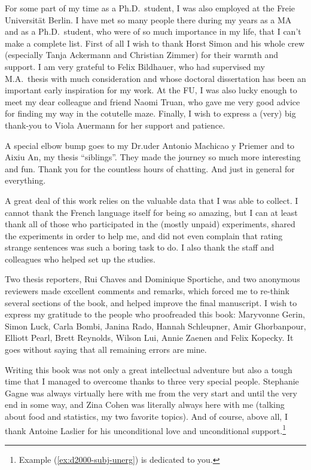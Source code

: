 For some part of my time as a Ph.D.\ student, I was also employed at the Freie Universität Berlin. I have met so many people there during my years as a MA and as a Ph.D.\ student, who were of so much importance in my life, that I can't make a complete list. First of all I wish to thank Horst Simon and his whole crew (especially Tanja Ackermann and Christian Zimmer) for their warmth and support. I am very grateful to Felix Bildhauer, who had supervised my M.A.\ thesis with much consideration and whose doctoral dissertation has been an important early inspiration for my work. At the FU, I was also lucky enough to meet my dear colleague and friend Naomi Truan, who gave me very good advice for finding my way in the cotutelle maze. Finally, I wish to express a (very) big thank-you to Viola Auermann for her support and patience.\largerpage

A special elbow bump goes to my Dr.uder Antonio Machicao y Priemer and to Aixiu An, my thesis ``siblings''. They made the journey so much more interesting and fun. Thank you for the countless hours of chatting. And just in general for everything.

A great deal of this work relies on the valuable data that I was able to collect. I cannot thank the French language itself for being so amazing,  but I can at least thank all of those who participated in the (mostly unpaid) experiments, shared the experiments in order to help me, and did not even complain that rating strange sentences was such a boring task to do. I also thank the staff and colleagues who helped set up the studies.

\begin{sloppypar}
Two thesis reporters, Rui Chaves and Dominique Sportiche, and two anonymous reviewers made excellent comments and remarks, which forced me to re-think several sections of the book, and helped improve the final manuscript. I wish to express my gratitude to the people who proofreaded this book: Maryvonne Gerin, Simon Luck, Carla Bombi, Janina Rado, Hannah Schleupner, Amir Ghorbanpour, Elliott Pearl, Brett Reynolds, Wilson Lui, Annie Zaenen and Felix Kopecky. It goes without saying that all remaining errors are mine.
\end{sloppypar}

Writing this book was not only a great intellectual adventure but also a tough time that I managed to overcome thanks to three very special people. Stephanie Gagne was always virtually here with me from the very start and until the very end in some way, and Zina Cohen was literally always here with me (talking about food and statistics, my two favorite topics). And of course, above all, I thank Antoine Laslier for his unconditional love and unconditional support.\footnote{Example (\ref{ex:d2000-subj-unerg}) is dedicated to you.}  


